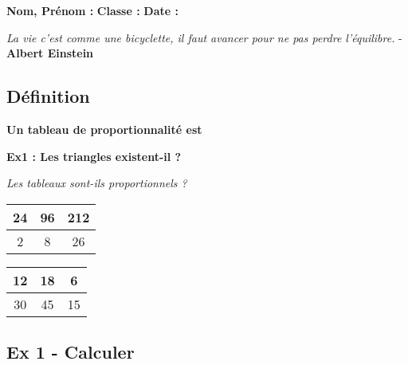 



\textbf{Nom, Prénom :} \hspace{8cm} \textbf{Classe :} \hspace{3cm} \textbf{Date :}\\
\vspace{-0.8cm}
\begin{center}
  \textit{La vie c’est comme une bicyclette, il faut avancer pour ne pas perdre l’équilibre.} - \textbf{Albert Einstein}
\end{center}
\vspace{-0.8cm}

\subsection*{Définition}

\textbf{Un tableau de proportionnalité est}\dotfill \\ \Pointilles[3] 

\textbf{Ex1 : Les triangles existent-il ?}

\textit{Les tableaux sont-ils proportionnels ? } 

\begin{multicols}{2}\noindent
  \begin{center}\begin{tabular}{|c|c|c|} \hline
    24 & 96 & 212 \\  \hline
    2 & 8 & 26\\  \hline
  \end{tabular}\end{center}

  \Pointilles[5]  \columnbreak 

  \begin{center}\begin{tabular}{|c|c|c|} \hline
    12 & 18 & 6 \\  \hline
    30 & 45 & 15\\  \hline
  \end{tabular}\end{center}

  \Pointilles[5] 

\end{multicols}

\subsection*{Ex 1 - Calculer}

